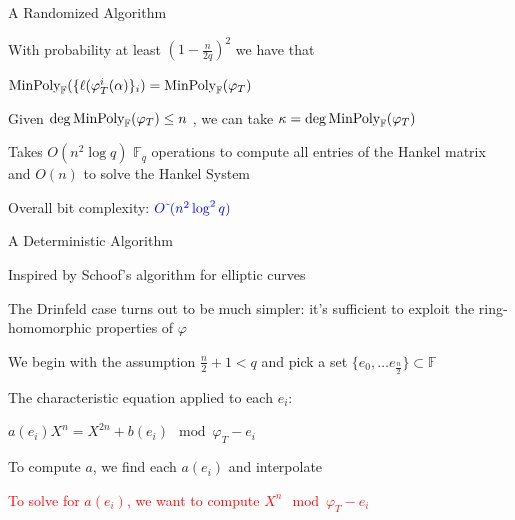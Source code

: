 \documentclass{beamer}
\newcommand{\minpol}{\textnormal{MinPoly}_{\mathbb{F}}}
\newcommand{\f}{\mathbb{F}}
\newcommand{\blue}{\textcolor{blue}}
\newcommand{\red}{\textcolor{red}}
\begin{document}
\begin{frame}{A Randomized Algorithm}


    \item  With probability at least $(1 - \frac{n}{2q})^2$ we have that \item \centerline{$\minpol(\{\ell(\varphi_T^i(\alpha)\}_i) = \minpol(\varphi_T)$}
    
    \item Given $\deg \minpol(\varphi_T) \leq n$ , we can take $\kappa = \deg \minpol(\varphi_T)$

        \item Takes $O(n^2 \log q)$ $\f_q$ operations to compute all entries of the Hankel matrix and $O(n)$ to solve the Hankel System
    \item Overall bit complexity: $\blue{O\tilde{~}(n^2 \log^2 q)}$

\end{frame}


\begin{frame}{A Deterministic Algorithm}


    \item Inspired by Schoof's algorithm for elliptic curves
    \item The Drinfeld case turns out to be much simpler: it's sufficient to exploit the ring-homomorphic properties of $\varphi$
    \item We begin with the assumption $ \frac{n}{2} + 1 < q$ and pick a set $\{e_0, \ldots e_{\frac{n}{2}}\} \subset \mathbb{F}$
    \item The characteristic equation applied to each $e_i$:
    \centerline{$a(e_i) X^n  = X^{2n} + b(e_i) \mod \varphi_{T} - e_i $}
    \item To compute $a$, we find each $a(e_i)$ and interpolate
    \item \red{To solve for $a(e_i)$, we want to compute $X^n \mod \varphi_{T} - e_i$}

    
\end{frame}


\end{document}
